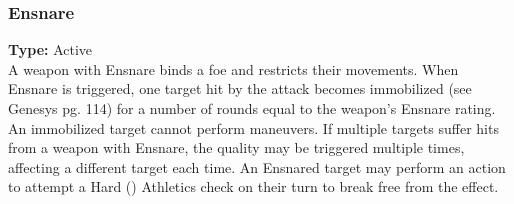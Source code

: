 \subsubsection{Ensnare}
\label{iqty:ensnare}
\textbf{Type:} Active\\
A weapon with Ensnare binds a foe and restricts their
movements. When Ensnare is triggered, one target hit
by the attack becomes immobilized (see Genesys pg. 114)
for a number of rounds equal to the weapon’s Ensnare
rating. An immobilized target cannot perform maneuvers.
If multiple targets suffer hits from a weapon with
Ensnare, the quality may be triggered multiple times,
affecting a different target each time.
An Ensnared target may perform an action to attempt
a Hard (\difficulty\difficulty\difficulty) Athletics
check on their turn to break free from the effect.
